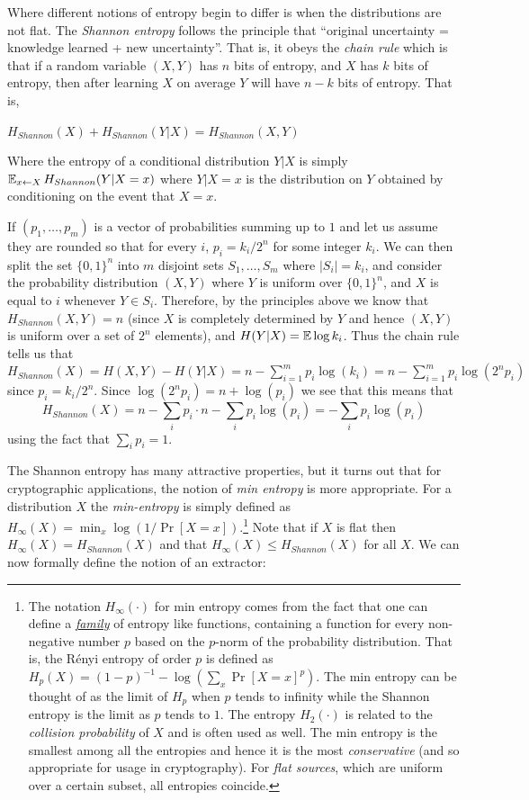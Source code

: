 Where different notions of entropy begin to differ is when the
distributions are not flat. The \emph{Shannon entropy} follows the
principle that ``original uncertainty = knowledge learned + new
uncertainty''. That is, it obeys the \emph{chain rule} which is that if
a random variable \((X,Y)\) has \(n\) bits of entropy, and \(X\) has
\(k\) bits of entropy, then after learning \(X\) on average \(Y\) will
have \(n-k\) bits of entropy. That is,

\(H_{Shannon}(X)+H_{Shannon}(Y|X) = H_{Shannon}(X,Y)\)

Where the entropy of a conditional distribution \(Y|X\) is simply
\(\operatorname*{\mathbb E}_{x\leftarrow X} H_{Shannon}(Y|X=x)\) where \(Y|X=x\) is the
distribution on \(Y\) obtained by conditioning on the event that
\(X=x\).

If \((p_1,\ldots,p_m)\) is a vector of probabilities summing up to \(1\)
and let us assume they are rounded so that for every \(i\),
\(p_i = k_i/2^n\) for some integer \(k_i\). We can then split the set
\(\{0,1\}^n\) into \(m\) disjoint sets \(S_1,\ldots,S_m\) where
\(|S_i|=k_i\), and consider the probability distribution \((X,Y)\) where
\(Y\) is uniform over \(\{0,1\}^n\), and \(X\) is equal to \(i\)
whenever \(Y\in S_i\). Therefore, by the principles above we know that
\(H_{Shannon}(X,Y)=n\) (since \(X\) is completely determined by \(Y\)
and hence \((X,Y)\) is uniform over a set of \(2^n\) elements), and
\(H(Y|X)= \operatorname*{\mathbb E} \log k_i\). Thus the chain rule tells us that
\(H_{Shannon}(X) = H(X,Y) - H(Y|X) = n - \sum_{i=1}^m p_i \log(k_i) = n - \sum_{i=1}^m p_i \log(2^n p_i)\)
since \(p_i = k_i/2^n\). Since \(\log(2^n p_i) = n + \log(p_i)\) we see
that this means that
\begin{equation*}
H_{Shannon}(X) =  n - \sum_i p_i \cdot n - \sum_i p_i \log(p_i) = - \sum_i p_i \log (p_i)
\end{equation*}
using the fact that \(\sum_i p_i = 1\).

The Shannon entropy has many attractive properties, but it turns out
that for cryptographic applications, the notion of \emph{min entropy} is
more appropriate. For a distribution \(X\) the \emph{min-entropy} is
simply defined as \(H_{\infty}(X)= \min_x \log(1/\Pr[X=x])\).\footnote{The
  notation \(H_{\infty}(\cdot)\) for min entropy comes from the fact
  that one can define a \href{https://goo.gl/HvVgu1}{\emph{family}} of
  entropy like functions, containing a function for every non-negative
  number \(p\) based on the \(p\)-norm of the probability distribution.
  That is, the Rényi entropy of order \(p\) is defined as
  \(H_p(X)=(1-p)^{-1}-\log(\sum_x \Pr[X=x]^p)\). The min entropy can be
  thought of as the limit of \(H_p\) when \(p\) tends to infinity while
  the Shannon entropy is the limit as \(p\) tends to \(1\). The entropy
  \(H_2(\cdot)\) is related to the \emph{collision probability} of \(X\)
  and is often used as well. The min entropy is the smallest among all
  the entropies and hence it is the most \emph{conservative} (and so
  appropriate for usage in cryptography). For \emph{flat sources}, which
  are uniform over a certain subset, all entropies coincide.} Note that
if \(X\) is flat then \(H_{\infty}(X)=H_{Shannon}(X)\) and that
\(H_{\infty}(X) \leq H_{Shannon}(X)\) for all \(X\). We can now formally
define the notion of an extractor:

